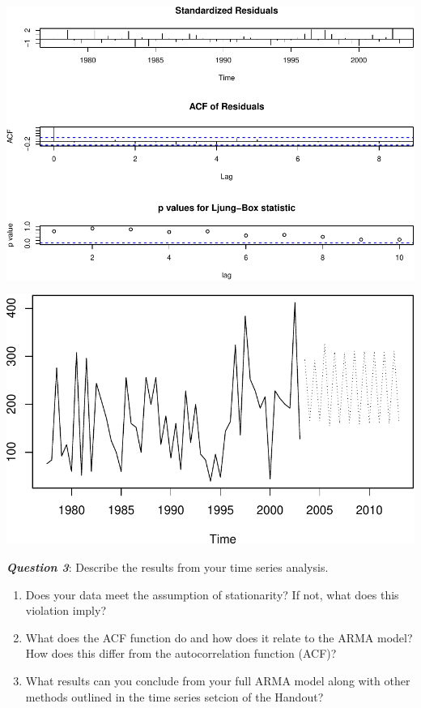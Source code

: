 \documentclass[]{article}
\newenvironment{Shaded}{\begin{snugshade}}{\end{snugshade}}
\newcommand{\KeywordTok}[1]{\textcolor[rgb]{0.13,0.29,0.53}{\textbf{{#1}}}}
\newcommand{\DataTypeTok}[1]{\textcolor[rgb]{0.13,0.29,0.53}{{#1}}}
\newcommand{\DecValTok}[1]{\textcolor[rgb]{0.00,0.00,0.81}{{#1}}}
\newcommand{\StringTok}[1]{\textcolor[rgb]{0.31,0.60,0.02}{{#1}}}
\newcommand{\NormalTok}[1]{{#1}}
\providecommand{\tightlist}{%
  \setlength{\itemsep}{0pt}\setlength{\parskip}{0pt}}
\begin{document}
\includegraphics{temporal_assignment_files/figure-latex/unnamed-chunk-4-6.pdf}

\begin{Shaded}
\end{Shaded}

\includegraphics{temporal_assignment_files/figure-latex/unnamed-chunk-4-7.pdf}

\textbf{\emph{Question 3}}: Describe the results from your time series
analysis.

\begin{enumerate}
\def\labelenumi{\alph{enumi}.}
\tightlist
\item
  Does your data meet the assumption of stationarity? If not, what does
  this violation imply?
\item
  What does the ACF function do and how does it relate to the ARMA
  model? How does this differ from the autocorrelation function (ACF)?
\item
  What results can you conclude from your full ARMA model along with
  other methods outlined in the time series setcion of the Handout?
\end{enumerate}
\end{document}
